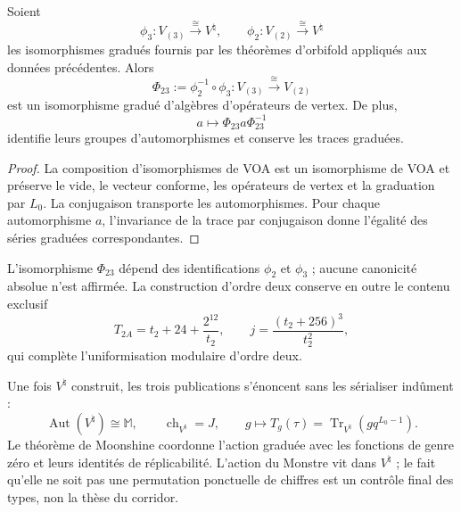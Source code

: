 \begin{theorem}
\label{thm:cierre-vtm-equivalencia-voa-23}
Soient
\[
 \phi_3:V_{(3)}\xrightarrow{\ \cong\ }V^\natural,
 \qquad
 \phi_2:V_{(2)}\xrightarrow{\ \cong\ }V^\natural
\]
les isomorphismes gradués fournis par les théorèmes d'orbifold
appliqués aux données précédentes. Alors
\[
 \boxed{\Phi_{23}:=\phi_2^{-1}\circ\phi_3:
 V_{(3)}\xrightarrow{\ \cong\ }V_{(2)}}
\]
est un isomorphisme gradué d'algèbres d'opérateurs de vertex. De plus,
\[
 a\longmapsto\Phi_{23}a\Phi_{23}^{-1}
\]
identifie leurs groupes d'automorphismes et conserve les traces graduées.
\end{theorem}

\begin{proof}
La composition d'isomorphismes de VOA est un isomorphisme de VOA et préserve le
vide, le vecteur conforme, les opérateurs de vertex et la graduation par
\(L_0\). La conjugaison transporte les automorphismes. Pour chaque automorphisme
\(a\), l'invariance de la trace par conjugaison donne l'égalité des
séries graduées correspondantes.
\end{proof}

L'isomorphisme \(\Phi_{23}\) dépend des identifications \(\phi_2\) et
\(\phi_3\) ; aucune canonicité absolue n'est affirmée. La construction d'ordre deux
conserve en outre le contenu exclusif
\[
 T_{2A}=t_2+24+\frac{2^{12}}{t_2},
 \qquad
 \boxed{j=\frac{(t_2+256)^3}{t_2^2}},
\]
qui complète l'uniformisation modulaire d'ordre deux.

Une fois \(V^\natural\) construit, les trois publications s'énoncent sans
les sérialiser indûment :
\[
 \operatorname{Aut}(V^\natural)\cong\mathbb M,
 \qquad
 \operatorname{ch}_{V^\natural}=J,
 \qquad
 g\longmapsto T_g(\tau)
 =\operatorname{Tr}_{V^\natural}\!\left(gq^{L_0-1}\right).
\]
Le théorème de Moonshine coordonne l'action graduée avec les fonctions de
genre zéro et leurs identités de réplicabilité. L'action du Monstre vit
dans \(V^\natural\) ; le fait qu'elle ne soit pas une permutation ponctuelle de chiffres est un contrôle
final des types, non la thèse du corridor.

